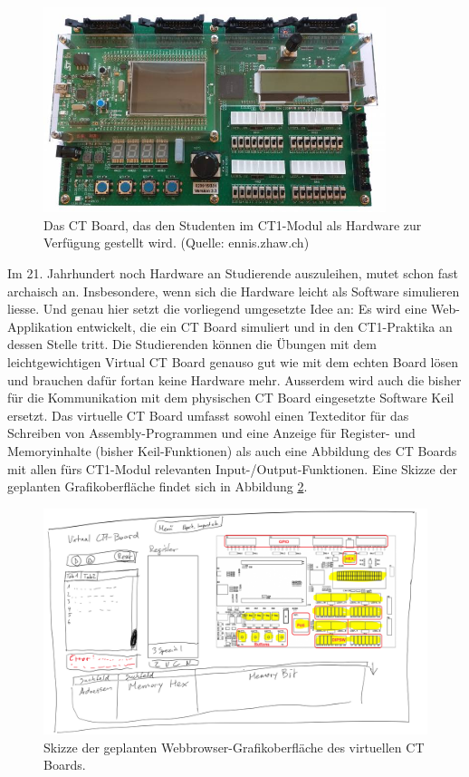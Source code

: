 \documentclass[10pt]{article}
\begin{document}
\begin{figure}[h]
\includegraphics[width=10cm]{ctboard}
\centering
\caption{Das CT Board, das den Studenten im CT1-Modul als Hardware zur Verfügung gestellt wird. (Quelle: ennis.zhaw.ch)}
\label{ctboard}
\end{figure}

Im 21. Jahrhundert noch Hardware an Studierende auszuleihen, mutet schon fast archaisch an. Insbesondere, wenn sich die Hardware leicht als Software simulieren liesse. Und genau hier setzt die vorliegend umgesetzte Idee an: Es wird eine Web-Applikation entwickelt, die ein CT Board simuliert und in den CT1-Praktika an dessen Stelle tritt. Die Studierenden können die Übungen mit dem leichtgewichtigen \glqq Virtual CT Board\grqq{} genauso gut wie mit dem echten Board lösen und brauchen dafür fortan keine Hardware mehr. Ausserdem wird auch die bisher für die Kommunikation mit dem physischen CT Board eingesetzte Software Keil ersetzt. Das virtuelle CT Board umfasst sowohl einen Texteditor für das Schreiben von Assembly-Programmen und eine Anzeige für Register- und Memoryinhalte (bisher Keil-Funktionen) als auch eine Abbildung des CT Boards mit allen fürs  CT1-Modul relevanten Input-/Output-Funktionen. Eine Skizze der geplanten Grafikoberfläche findet sich in Abbildung \ref{draft}.

\begin{figure}[h]
\includegraphics[width=\textwidth]{draft}
\caption[size=8pt]{Skizze der geplanten Webbrowser-Grafikoberfläche des virtuellen CT Boards.}
\label{draft}
\end{figure}
\end{document}
